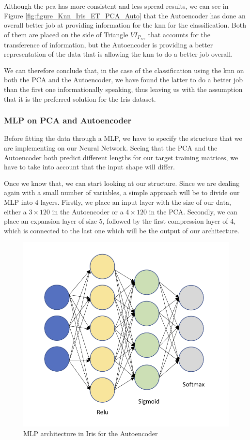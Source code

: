 \documentclass[12pt]{report}
\begin{document}
Although the pca has more consistent and less spread results, we can see in Figure \ref{fig:figure_Knn_Iris_ET_PCA_Auto} that the Autoencoder has done an overall better job at providing information for the knn for the classification. Both of them are placed on the side of Triangle $VI_{P_{XY}}$ that accounts for the transference of information, but the Autoencoder is providing a better representation of the data that is allowing the knn to do a better job overall. \par

We can therefore conclude that, in the case of the classification using the  knn on both the PCA and the Autoencoder, we have found the latter to do a better job than the first one informationally speaking, thus leaving us with the assumption that it is the preferred solution for the Iris dataset.

\subsubsection{	MLP on PCA and Autoencoder}

Before fitting the data through a MLP, we have to specify the structure that we are implementing on our Neural Network. Seeing that the PCA and the Autoencoder both predict different lengths for our target training matrices, we have to take into account that the input shape will differ. \par

Once we know that, we can start looking at our structure. Since we are dealing again with a small number of variables, a simple approach will be to divide our MLP into 4 layers. Firstly, we place an input layer with the size of our data, either a $3\times120$ in the Autoencoder or a $4\times120$ in the PCA. Secondly, we can place an expansion layer of size 5, followed by the first compression layer of 4, which is connected to the last one which will be the output of our architecture. \par

\begin{figure}[H]
	
	\includegraphics[width=0.8\linewidth]{Figuras_tfg/Example_MLP_Auto.png}
	\caption{MLP architecture in Iris for the Autoencoder}
	\label{fig:figure_MLP_Iris_Autoencoder}
\end{figure}
\end{document}

